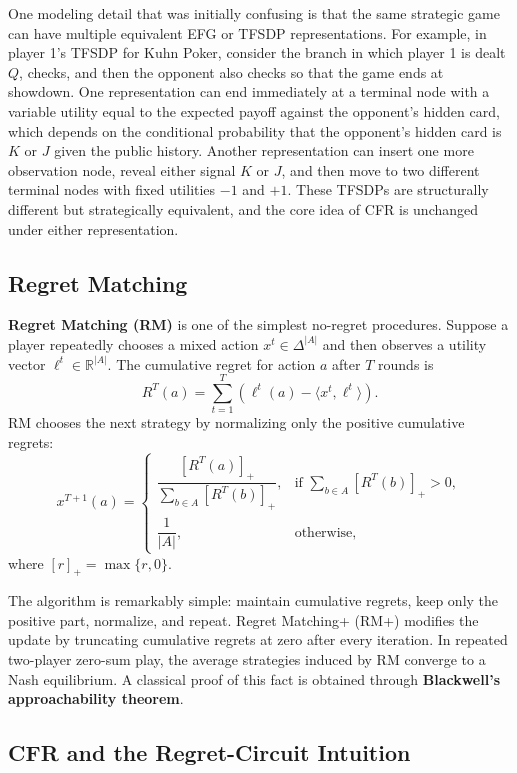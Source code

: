 \documentclass[11pt]{article}
\begin{document}
One modeling detail that was initially confusing is that the same strategic game can have multiple equivalent EFG or TFSDP representations. For example, in player 1's TFSDP for Kuhn Poker, consider the branch in which player 1 is dealt $Q$, checks, and then the opponent also checks so that the game ends at showdown. One representation can end immediately at a terminal node with a variable utility equal to the expected payoff against the opponent's hidden card, which depends on the conditional probability that the opponent's hidden card is $K$ or $J$ given the public history. Another representation can insert one more observation node, reveal either signal $K$ or $J$, and then move to two different terminal nodes with fixed utilities $-1$ and $+1$. These TFSDPs are structurally different but strategically equivalent, and the core idea of CFR is unchanged under either representation.

\subsection{Regret Matching}

\textbf{Regret Matching (RM)} is one of the simplest no-regret procedures. Suppose a player repeatedly chooses a mixed action $x^t \in \Delta^{|A|}$ and then observes a utility vector $\ell^t \in \mathbb{R}^{|A|}$. The cumulative regret for action $a$ after $T$ rounds is
\[
R^T(a) = \sum_{t=1}^{T} \left(\ell^t(a) - \langle x^t, \ell^t \rangle\right).
\]
RM chooses the next strategy by normalizing only the positive cumulative regrets:
\[
x^{T+1}(a) =
\begin{cases}
\dfrac{[R^T(a)]_+}{\sum_{b \in A} [R^T(b)]_+}, & \text{if } \sum_{b \in A} [R^T(b)]_+ > 0, \\[1.2ex]
\dfrac{1}{|A|}, & \text{otherwise},
\end{cases}
\]
where $[r]_+ = \max\{r, 0\}$.

The algorithm is remarkably simple: maintain cumulative regrets, keep only the positive part, normalize, and repeat. Regret Matching+ (RM+) modifies the update by truncating cumulative regrets at zero after every iteration. In repeated two-player zero-sum play, the average strategies induced by RM converge to a Nash equilibrium. A classical proof of this fact is obtained through \textbf{Blackwell's approachability theorem}.

\subsection{CFR and the Regret-Circuit Intuition}
\end{document}
